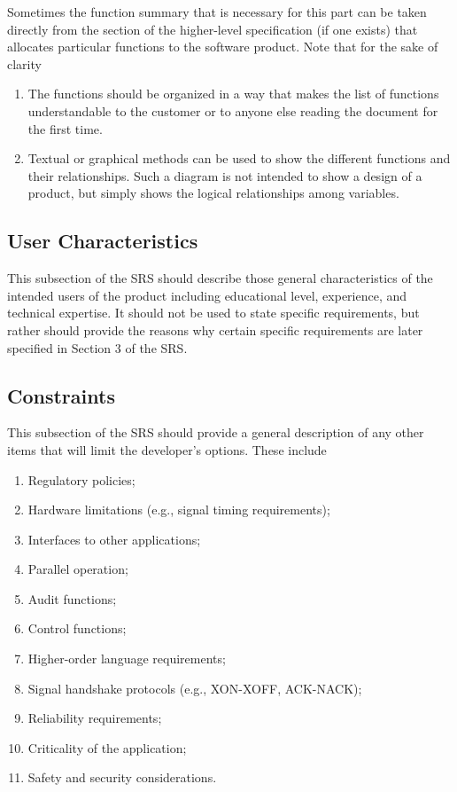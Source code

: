 \documentclass[draftclsnofoot,onecolumn,10pt]{IEEEtran}
\begin{document}
\begin{enumerate}
Sometimes the function summary that is necessary for this part can be taken
directly from the section of the higher-level specification (if one exists) that
allocates particular functions to the software product. Note that for the sake
of clarity
\begin{enumerate}
	\item The functions should be organized in a way that makes the list of
		functions understandable to the customer or to anyone else reading the
		document for the first time.
	\item Textual or graphical methods can be used to show the different
		functions and their relationships. Such a diagram is not intended to
		show a design of a product, but simply shows the logical relationships
		among variables.
\end{enumerate}

\subsection{User Characteristics}
This subsection of the SRS should describe those general characteristics of the
intended users of the product including educational level, experience, and
technical expertise. It should not be used to state specific requirements, but
rather should provide the reasons why certain specific requirements are later
specified in Section 3 of the SRS.

\subsection{Constraints}
This subsection of the SRS should provide a general description of any other
items that will limit the developer's options. These include
\begin{enumerate}
	\item Regulatory policies;
	\item Hardware limitations (e.g., signal timing requirements);
	\item Interfaces to other applications;
	\item Parallel operation;
	\item Audit functions;
	\item Control functions;
	\item Higher-order language requirements;
	\item Signal handshake protocols (e.g., XON-XOFF, ACK-NACK);
	\item Reliability requirements;
	\item Criticality of the application;
	\item Safety and security considerations.
\end{enumerate}


\end{enumerate}
\end{document}
